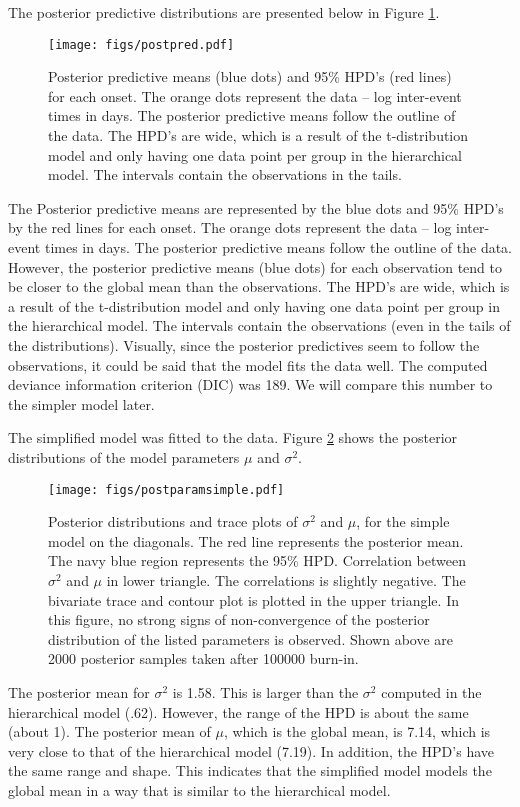 \documentclass{../../tex_template/asaproc}
\begin{document}
The posterior predictive distributions are presented below in Figure
\ref{fig:postpred}.
\begin{figure}[H]
  \texttt{[image: figs/postpred.pdf]}
  \caption{\small Posterior predictive means (blue dots) and 95\% HPD's (red lines) 
  for each onset. The orange dots represent the data -- log inter-event 
  times in days. The posterior predictive means follow the outline of the data. The
  HPD's are wide, which is a result of the t-distribution model and only
  having one data point per group in the hierarchical model. The intervals
  contain the observations in the tails.}
  \label{fig:postpred}
\end{figure}
The Posterior predictive means are represented by the blue dots and 95\% HPD's
by the red lines for each onset. The orange dots represent the data -- log
inter-event times in days. The posterior predictive means follow the outline of
the data. However, the posterior predictive means (blue dots) for each
observation tend to be closer to the global mean than the observations. The
HPD's are wide, which is a result of the t-distribution model and only having
one data point per group in the hierarchical model. The intervals contain the
observations (even in the tails of the distributions). Visually, since the
posterior predictives seem to follow the observations, it could be said that
the model fits the data well. The computed deviance information criterion
(DIC) was 189. We will compare this number to the simpler model later.

The simplified model was fitted to the data. Figure \ref{fig:postparamsimple}
shows the posterior distributions of the model parameters $\mu$ and $\sigma^2$.
\begin{figure}[H]
  \texttt{[image: figs/postparamsimple.pdf]}
  \caption{\small Posterior distributions and trace plots of $\sigma^2$ and $\mu$,
    for the simple model on the diagonals. The red line represents the posterior mean. 
    The navy blue region represents the 95\% HPD. Correlation between $\sigma^2$ and
    $\mu$ in lower triangle. The correlations is slightly negative. The 
    bivariate trace and contour plot is plotted in the upper triangle. 
    In this figure, no strong signs of non-convergence of the posterior distribution 
    of the listed parameters is observed. Shown above are 2000 posterior samples 
    taken after 100000 burn-in.}
  \label{fig:postparamsimple}
\end{figure}
The posterior mean for $\sigma^2$ is 1.58. This is larger than the $\sigma^2$
computed in the hierarchical model (.62). However, the range of the HPD is
about the same (about 1).  The posterior mean of $\mu$, which is the global
mean, is 7.14, which is very close to that of the hierarchical model (7.19). In
addition, the HPD's have the same range and shape. This indicates that the
simplified model models the global mean in a way that is similar to the
hierarchical model. 
\end{document}
